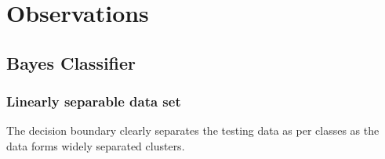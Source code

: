 \documentclass[a4paper]{article}
\begin{document}

\section{Observations}
	\subsection{Bayes Classifier} 
		\subsubsection{Linearly separable data set}
			The decision boundary clearly separates the testing data as per classes as
			the data forms widely separated clusters.
			
\end{document}

